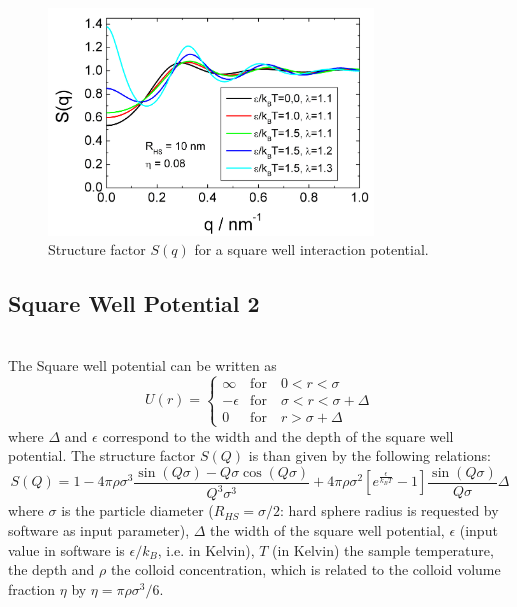 \begin{figure}[htb]
\begin{center}
\includegraphics[width=0.768\textwidth,height=0.528\textwidth]{../images/structure_factor/HardSphere/SquareWellSQ.png}
\end{center}
\caption{Structure factor $S(q)$ for a square well interaction potential.}
\label{fig:SquareWell1}
\end{figure}


\clearpage
\subsection{Square Well Potential 2} ~\\

The Square well potential can be written as
\begin{equation}
U(r) =
 \begin{cases}
      \infty    & \text{for} \quad 0<r<\sigma \\
      -\epsilon & \text{for} \quad \sigma<r<\sigma+\Delta \\
      0         & \text{for} \quad r>\sigma+\Delta
   \end{cases}
\end{equation}
where $\Delta$ and $\epsilon$ correspond to the width and the
depth of the square well potential. The structure factor $S(Q)$ is
than given by the following relations:
\begin{equation}
S(Q)  = 1
-4\pi\rho\sigma^3\frac{\sin(Q\sigma)-Q\sigma\cos(Q\sigma)}{Q^3\sigma^3}
          +4\pi\rho\sigma^2\left[e^{\frac{\epsilon}{k_BT}}-1\right]\frac{\sin(Q\sigma)}{Q\sigma}
          \Delta
\end{equation}
where $\sigma$ is the particle diameter ($R_{HS} = \sigma/2$: hard
sphere radius is requested by software as input parameter),
$\Delta$ the width of the square well potential, $\epsilon$ (input
value in software is $\epsilon/k_B$, i.e. in Kelvin), $T$ (in
Kelvin) the sample temperature, the depth and $\rho$ the colloid
concentration, which is related to the colloid volume fraction
$\eta$ by $\eta=\pi\rho\sigma^3/6$.


